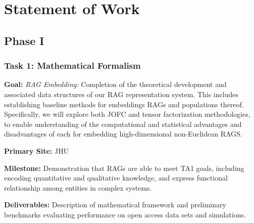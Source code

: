 \section{Statement of Work}
\label{sec:sow}
% 




\subsection{Phase I}


\subsubsection{Task 1: Mathematical Formalism}
\begin{compactitem}
\item \textbf{Goal:} \emph{RAG Embedding:} Completion of the theoretical development and associated data structures of our RAG representation system. This includes establishing baseline methods for embeddings RAGs and populations thereof.  Specifically, we will explore both JOFC and tensor factorization methodologies, to enable understanding of the computational and statistical advantages and disadvantages of each for embedding high-dimensional non-Euclidean RAGS.

\item \textbf{Primary Site:} JHU
\item \textbf{Milestone:} Demonstration that RAGs are able to meet TA1 goals, including encoding quantitative and qualitative knowledge, and express functional relationship among entities in complex systems.
\item \textbf{Deliverables:} Description of mathematical framework and preliminary benchmarks evaluating performance on open access data sets and simulations.
\end{compactitem}


